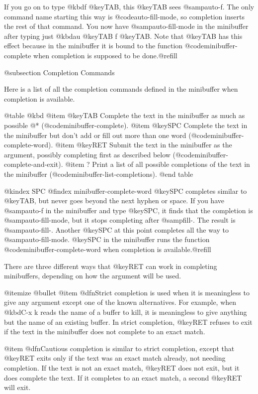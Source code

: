 {{  If you go on to type @kbd{f @key{TAB}}, this @key{TAB} sees
@samp{auto-f}.  The only command name starting this way is
@code{auto-fill-mode}, so completion inserts the rest of that command.  You
now have @samp{auto-fill-mode} in the minibuffer after typing just @kbd{au
@key{TAB} f @key{TAB}}.  Note that @key{TAB} has this effect because in the
minibuffer it is bound to the function @code{minibuffer-complete} when
completion is supposed to be done.@refill

@subsection Completion Commands

  Here is a list of all the completion commands defined in the minibuffer
when completion is available.

@table @kbd
@item @key{TAB}
Complete the text in the minibuffer as much as possible @*
(@code{minibuffer-complete}).
@item @key{SPC}
Complete the text in the minibuffer but don't add or fill out more
than one word (@code{minibuffer-complete-word}).
@item @key{RET}
Submit the text in the minibuffer as the argument, possibly completing
first as described below (@code{minibuffer-complete-and-exit}).
@item ?
Print a list of all possible completions of the text in the minibuffer
(@code{minibuffer-list-completions}).
@end table

@kindex SPC
@findex minibuffer-complete-word
@key{SPC} completes similar to @key{TAB}, but never goes beyond the
next hyphen or space.  If you have @samp{auto-f} in the minibuffer and type
@key{SPC}, it finds that the completion is @samp{auto-fill-mode}, but it
stops completing after @samp{fill-}. The result is @samp{auto-fill-}.
Another @key{SPC} at this point completes all the way to
@samp{auto-fill-mode}.  @key{SPC} in the minibuffer runs the function
@code{minibuffer-complete-word} when completion is available.@refill

  There are three different ways that @key{RET} can work in completing
minibuffers, depending on how the argument will be used.

@itemize @bullet
@item
@dfn{Strict} completion is used when it is meaningless to give any
argument except one of the known alternatives.  For example, when
@kbd{C-x k} reads the name of a buffer to kill, it is meaningless to
give anything but the name of an existing buffer.  In strict
completion, @key{RET} refuses to exit if the text in the minibuffer
does not complete to an exact match.

@item
@dfn{Cautious} completion is similar to strict completion, except that
@key{RET} exits only if the text was an exact match already, not
needing completion.  If the text is not an exact match, @key{RET} does
not exit, but it does complete the text.  If it completes to an exact
match, a second @key{RET} will exit.

}}
